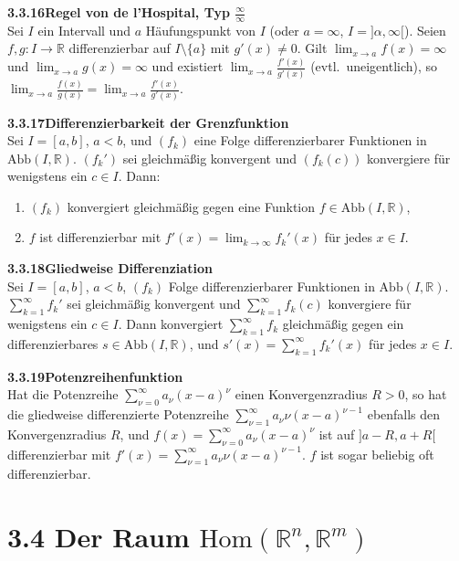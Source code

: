 \documentclass[a4paper,12pt]{article}
\newcommand{\gentry}[3]{%
  \noindent\textbf{#1\quad #2}\nopagebreak\\[0.2em]
  #3\par\smallskip
}
\begin{document}
\gentry{3.3.16}{Regel von de l'Hospital, Typ $\tfrac{\infty}{\infty}$}{%
  Sei $I$ ein Intervall und $a$ H\"aufungspunkt von $I$ (oder $a = \infty$,
  $I = ]\alpha, \infty[$). Seien $f, g : I \to \mathbb{R}$ differenzierbar auf
  $I \setminus \{a\}$ mit $g'(x) \neq 0$. Gilt $\lim_{x \to a} f(x) = \infty$ und
  $\lim_{x \to a} g(x) = \infty$ und existiert $\lim_{x \to a} \tfrac{f'(x)}{g'(x)}$
  (evtl.\ uneigentlich), so $\lim_{x \to a} \tfrac{f(x)}{g(x)} = \lim_{x \to a} \tfrac{f'(x)}{g'(x)}$.
}

\gentry{3.3.17}{Differenzierbarkeit der Grenzfunktion}{%
  Sei $I = [a, b]$, $a < b$, und $(f_k)$ eine Folge differenzierbarer Funktionen in
  $\mathrm{Abb}(I, \mathbb{R})$. $(f_k')$ sei gleichm\"a{\ss}ig konvergent und $(f_k(c))$
  konvergiere f\"ur wenigstens ein $c \in I$. Dann:
  \begin{enumerate}[label=(\roman*),topsep=2pt,itemsep=1pt]
    \item $(f_k)$ konvergiert gleichm\"a{\ss}ig gegen eine Funktion $f \in \mathrm{Abb}(I, \mathbb{R})$,
    \item $f$ ist differenzierbar mit $f'(x) = \lim_{k \to \infty} f_k'(x)$ f\"ur jedes $x \in I$.
  \end{enumerate}
}

\gentry{3.3.18}{Gliedweise Differenziation}{%
  Sei $I = [a, b]$, $a < b$, $(f_k)$ Folge differenzierbarer Funktionen in
  $\mathrm{Abb}(I, \mathbb{R})$. $\sum_{k=1}^\infty f_k'$ sei gleichm\"a{\ss}ig konvergent
  und $\sum_{k=1}^\infty f_k(c)$ konvergiere f\"ur wenigstens ein $c \in I$. Dann
  konvergiert $\sum_{k=1}^\infty f_k$ gleichm\"a{\ss}ig gegen ein differenzierbares
  $s \in \mathrm{Abb}(I, \mathbb{R})$, und
  $s'(x) = \sum_{k=1}^\infty f_k'(x)$ f\"ur jedes $x \in I$.
}

\gentry{3.3.19}{Potenzreihenfunktion}{%
  Hat die Potenzreihe $\sum_{\nu=0}^\infty a_\nu (x - a)^\nu$ einen Konvergenzradius
  $R > 0$, so hat die gliedweise differenzierte Potenzreihe
  $\sum_{\nu=1}^\infty a_\nu \nu (x - a)^{\nu-1}$ ebenfalls den Konvergenzradius $R$,
  und $f(x) = \sum_{\nu=0}^\infty a_\nu (x - a)^\nu$ ist auf $]a - R, a + R[$
  differenzierbar mit $f'(x) = \sum_{\nu=1}^\infty a_\nu \nu (x - a)^{\nu-1}$.
  $f$ ist sogar beliebig oft differenzierbar.
}

\section*{3.4 \quad Der Raum $\mathrm{Hom}(\mathbb{R}^n, \mathbb{R}^m)$}
\end{document}
